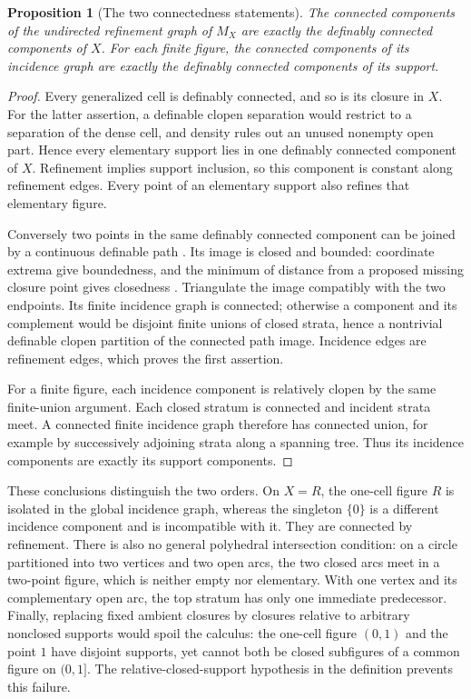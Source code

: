 \documentclass[11pt,a4paper]{article}
\newtheorem{proposition}[theorem]{Proposition}
\theoremstyle{definition}
\begin{document}
\begin{proposition}[The two connectedness statements]\label{prop:cellcomponents}
The connected components of the undirected refinement graph of $M_X$ are exactly the definably connected components of $X$. For each finite figure, the connected components of its incidence graph are exactly the definably connected components of its support.
\end{proposition}
\begin{proof}
Every generalized cell is definably connected, and so is its closure in $X$. For the latter assertion, a definable clopen separation would restrict to a separation of the dense cell, and density rules out an unused nonempty open part. Hence every elementary support lies in one definably connected component of $X$. Refinement implies support inclusion, so this component is constant along refinement edges. Every point of an elementary support also refines that elementary figure.

Conversely two points in the same definably connected component can be joined by a continuous definable path \cite[Theorem~3.9, p.~28]{Coste}. Its image is closed and bounded: coordinate extrema give boundedness, and the minimum of distance from a proposed missing closure point gives closedness \cite[Theorem~3.4, pp.~26--27]{Coste}. Triangulate the image compatibly with the two endpoints. Its finite incidence graph is connected; otherwise a component and its complement would be disjoint finite unions of closed strata, hence a nontrivial definable clopen partition of the connected path image. Incidence edges are refinement edges, which proves the first assertion.

For a finite figure, each incidence component is relatively clopen by the same finite-union argument. Each closed stratum is connected and incident strata meet. A connected finite incidence graph therefore has connected union, for example by successively adjoining strata along a spanning tree. Thus its incidence components are exactly its support components.
\end{proof}

These conclusions distinguish the two orders. On $X=R$, the one-cell figure $R$ is isolated in the global incidence graph, whereas the singleton $\{0\}$ is a different incidence component and is incompatible with it. They are connected by refinement. There is also no general polyhedral intersection condition: on a circle partitioned into two vertices and two open arcs, the two closed arcs meet in a two-point figure, which is neither empty nor elementary. With one vertex and its complementary open arc, the top stratum has only one immediate predecessor. Finally, replacing fixed ambient closures by closures relative to arbitrary nonclosed supports would spoil the calculus: the one-cell figure $(0,1)$ and the point $1$ have disjoint supports, yet cannot both be closed subfigures of a common figure on $(0,1]$. The relative-closed-support hypothesis in the definition prevents this failure.
\end{document}
